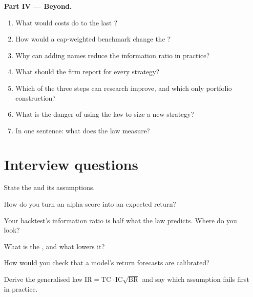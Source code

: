\begin{problem}
\medskip\noindent\textbf{Part IV --- Beyond.}
\begin{enumerate}[resume]
\item What would costs do to the last ?
\item How would a cap-weighted benchmark change the ?
\item Why can adding names reduce the information ratio in practice?
\item What should the firm report for every strategy?
\item Which of the three steps can research improve, and which only portfolio construction?
\item What is the danger of using the law to size a new strategy?
\item In one sentence: what does the law measure?
\end{enumerate}
\end{problem}

\section{Interview questions}

\begin{interviewq}\label{iq:rs:from-signal-to-forecast:1}
State the  and its assumptions.
\end{interviewq}

\begin{interviewq}\label{iq:rs:from-signal-to-forecast:2}
How do you turn an alpha score into an expected return?
\end{interviewq}

\begin{interviewq}\label{iq:rs:from-signal-to-forecast:3}
Your backtest's information ratio is half what the law predicts. Where do you look?
\end{interviewq}

\begin{interviewq}\label{iq:rs:from-signal-to-forecast:4}
What is the , and what lowers it?
\end{interviewq}

\begin{interviewq}\label{iq:rs:from-signal-to-forecast:5}
How would you check that a model's return forecasts are calibrated?
\end{interviewq}

\begin{interviewq}\label{iq:rs:from-signal-to-forecast:6}
Derive the generalised law $\mathrm{IR} = \mathrm{TC}\cdot\mathrm{IC}\sqrt{\mathrm{BR}}$ and say which assumption fails first in practice.
\end{interviewq}
